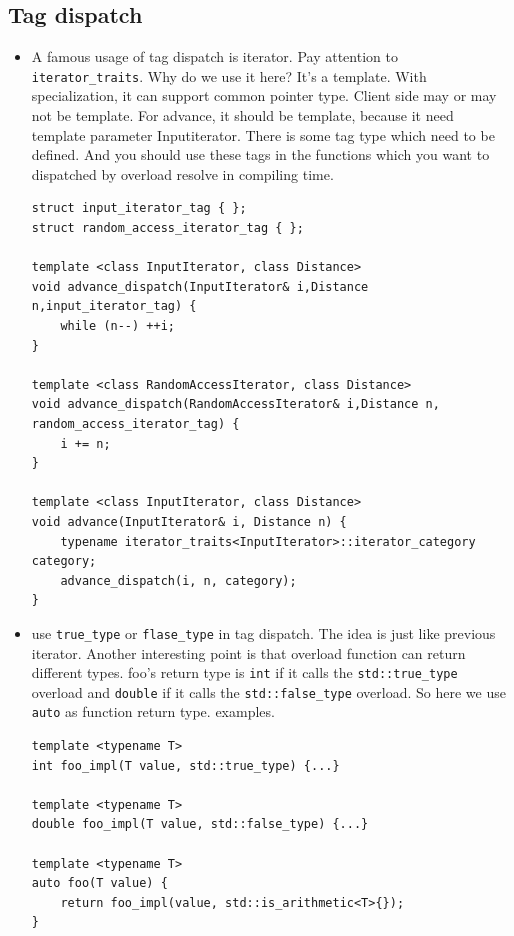 \documentclass[a4paper,11pt,twoside]{book}
\begin{document}
\subsection{Tag dispatch}
\begin{itemize}
	\item A famous usage of tag dispatch is iterator. Pay attention to \texttt{iterator\_traits}. Why do we use it here? It's a template. With specialization, it can support common pointer type. Client side may or may not be template. For advance, it should be template, because it need template parameter Inputiterator. There is some tag type which need to be defined. And you should use these tags in the functions which you want to dispatched by overload resolve in compiling time. 

\begin{lstlisting}[numbers=none]
struct input_iterator_tag { };
struct random_access_iterator_tag { };

template <class InputIterator, class Distance>
void advance_dispatch(InputIterator& i,Distance n,input_iterator_tag) {
	while (n--) ++i;
}
	
template <class RandomAccessIterator, class Distance>
void advance_dispatch(RandomAccessIterator& i,Distance n, random_access_iterator_tag) {
	i += n;
}

template <class InputIterator, class Distance>
void advance(InputIterator& i, Distance n) {
	typename iterator_traits<InputIterator>::iterator_category category;
	advance_dispatch(i, n, category);
}	
\end{lstlisting}	

    \item use \texttt{true\_type} or \texttt{flase\_type} in tag dispatch. The idea is just like previous iterator. Another interesting point is that overload function can return different types. foo's return type is \texttt{int} if it calls the \texttt{std::true\_type} overload and \texttt{double} if it calls the \texttt{std::false\_type} overload. So here we use \texttt{auto} as function return type. examples.
\begin{lstlisting}[numbers=none]
template <typename T>
int foo_impl(T value, std::true_type) {...}

template <typename T>
double foo_impl(T value, std::false_type) {...}

template <typename T>
auto foo(T value) {
	return foo_impl(value, std::is_arithmetic<T>{});
}
\end{lstlisting}

\end{itemize}
\end{document}
